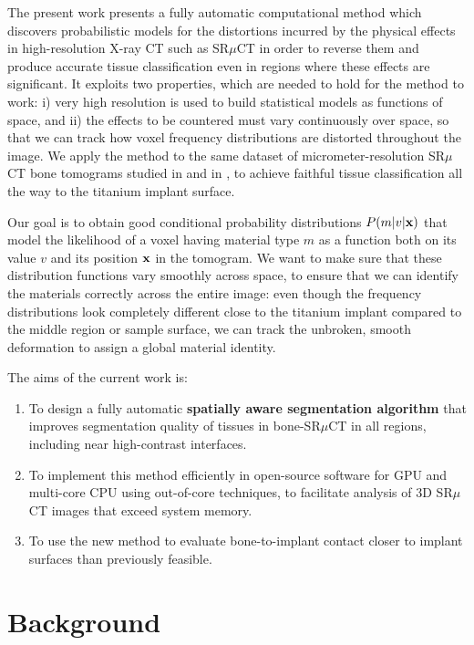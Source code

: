 \documentclass[pdflatex,sn-mathphys]{sn-jnl}%
\theoremstyle{thmstyleone}%
\theoremstyle{thmstyletwo}%
\theoremstyle{thmstylethree}%
\begin{document}
The present work presents a fully automatic computational method which discovers probabilistic
models for the distortions incurred by the physical effects in high-resolution X-ray CT such
as SR$\mu$CT in order to reverse them and produce accurate tissue classification even in regions
where these effects are significant. It exploits two properties, which are needed to hold for
the method to work: i) very high resolution is used to build statistical models as functions
of space, and ii) the effects to be countered must vary continuously over space, so that we can
track how voxel frequency distributions are distorted throughout the image.
We apply the method to the
same dataset of micrometer-resolution SR$\mu$CT bone tomograms studied in \cite{torsten2018}
and in \cite{sporring}, to achieve faithful tissue classification all the way to the titanium
implant surface.

Our goal is to obtain good conditional probability distributions $P\!\left(m\vert v\middle\vert \mathbf{x}\right)$
that model the likelihood of a voxel having material type $m$ as a function
both on its value $v$ and its position $\mathbf{x}$ in the tomogram. We want to make sure that these distribution
functions vary smoothly across space, to ensure that we can identify the materials correctly across the entire
image: even though the frequency distributions look completely different
close to the titanium implant compared to the middle region or sample surface,
we can track the unbroken, smooth deformation to assign a global material
identity.

The aims of the current work is:
\begin{enumerate}
\item To design a fully automatic \textbf{spatially aware segmentation algorithm} that
  improves segmentation quality of tissues in bone-SR$\mu$CT in all regions, including near high-contrast interfaces.
\item To implement this method efficiently in open-source software for GPU and multi-core CPU using out-of-core techniques, to
  facilitate analysis of 3D SR$\mu$CT images that exceed system memory.
\item To use the new method to evaluate bone-to-implant contact closer to implant surfaces than previously feasible. 
\end{enumerate}

\section{Background}
\label{sec:background}
\end{document}
